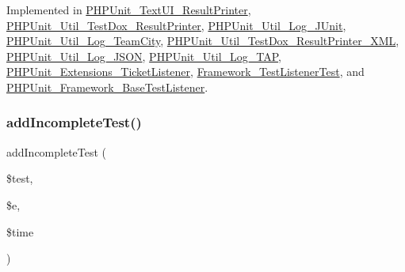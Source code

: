 Implemented in \mbox{\hyperlink{class_p_h_p_unit___text_u_i___result_printer_a668f17b68705c5c8686bac690a6f719d}{P\+H\+P\+Unit\+\_\+\+Text\+U\+I\+\_\+\+Result\+Printer}}, \mbox{\hyperlink{class_p_h_p_unit___util___test_dox___result_printer_a668f17b68705c5c8686bac690a6f719d}{P\+H\+P\+Unit\+\_\+\+Util\+\_\+\+Test\+Dox\+\_\+\+Result\+Printer}}, \mbox{\hyperlink{class_p_h_p_unit___util___log___j_unit_a668f17b68705c5c8686bac690a6f719d}{P\+H\+P\+Unit\+\_\+\+Util\+\_\+\+Log\+\_\+\+J\+Unit}}, \mbox{\hyperlink{class_p_h_p_unit___util___log___team_city_a668f17b68705c5c8686bac690a6f719d}{P\+H\+P\+Unit\+\_\+\+Util\+\_\+\+Log\+\_\+\+Team\+City}}, \mbox{\hyperlink{class_p_h_p_unit___util___test_dox___result_printer___x_m_l_a668f17b68705c5c8686bac690a6f719d}{P\+H\+P\+Unit\+\_\+\+Util\+\_\+\+Test\+Dox\+\_\+\+Result\+Printer\+\_\+\+X\+ML}}, \mbox{\hyperlink{class_p_h_p_unit___util___log___j_s_o_n_a668f17b68705c5c8686bac690a6f719d}{P\+H\+P\+Unit\+\_\+\+Util\+\_\+\+Log\+\_\+\+J\+S\+ON}}, \mbox{\hyperlink{class_p_h_p_unit___util___log___t_a_p_a668f17b68705c5c8686bac690a6f719d}{P\+H\+P\+Unit\+\_\+\+Util\+\_\+\+Log\+\_\+\+T\+AP}}, \mbox{\hyperlink{class_p_h_p_unit___extensions___ticket_listener_a668f17b68705c5c8686bac690a6f719d}{P\+H\+P\+Unit\+\_\+\+Extensions\+\_\+\+Ticket\+Listener}}, \mbox{\hyperlink{class_framework___test_listener_test_a668f17b68705c5c8686bac690a6f719d}{Framework\+\_\+\+Test\+Listener\+Test}}, and \mbox{\hyperlink{class_p_h_p_unit___framework___base_test_listener_a668f17b68705c5c8686bac690a6f719d}{P\+H\+P\+Unit\+\_\+\+Framework\+\_\+\+Base\+Test\+Listener}}.

\mbox{\label{interface_p_h_p_unit___framework___test_listener_a81bfe09a62194fe5769ca1cc36ee428b}} 
\subsubsection{\texorpdfstring{add\+Incomplete\+Test()}{addIncompleteTest()}}
{\footnotesize\ttfamily add\+Incomplete\+Test (\begin{DoxyParamCaption}\item[{\mbox{\hyperlink{interface_p_h_p_unit___framework___test}{P\+H\+P\+Unit\+\_\+\+Framework\+\_\+\+Test}}}]{\$test,  }\item[{Exception}]{\$e,  }\item[{}]{\$time }\end{DoxyParamCaption})}

